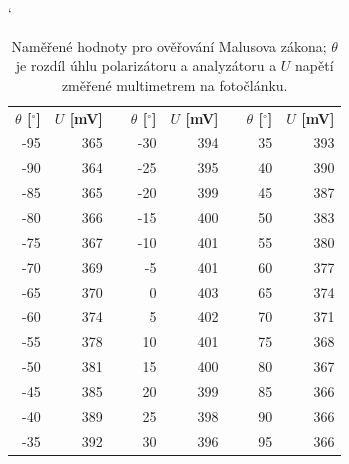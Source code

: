 \documentclass[english]{article}
\newcommand{\unit}[1]{\mathrm{#1}}
\begin{document}
				
		\begin{table}[htbp]
		\catcode` %
		  \centering
		    \begin{tabular}{|r|r|r|r|r|r|r|r|}
		\cline{1-2}\cline{4-5}\cline{7-8}    \boldmath{}\textbf{$\theta$ [$\unit{^\circ}$]}\unboldmath{} & \boldmath{}\textbf{$U$ [mV]}\unboldmath{} &       & \boldmath{}\textbf{$\theta$ [$\unit{^\circ}$]}\unboldmath{} & \boldmath{}\textbf{$U$ [mV]}\unboldmath{} &       & \boldmath{}\textbf{$\theta$ [$\unit{^\circ}$]}\unboldmath{} & \boldmath{}\textbf{$U$ [mV]}\unboldmath{} \bigstrut\\
		\cline{1-2}\cline{4-5}\cline{7-8}    -95   & 365   &       & -30   & 394   &       & 35    & 393 \bigstrut\\
		\cline{1-2}\cline{4-5}\cline{7-8}    -90   & 364   &       & -25   & 395   &       & 40    & 390 \bigstrut\\
		\cline{1-2}\cline{4-5}\cline{7-8}    -85   & 365   &       & -20   & 399   &       & 45    & 387 \bigstrut\\
		\cline{1-2}\cline{4-5}\cline{7-8}    -80   & 366   &       & -15   & 400   &       & 50    & 383 \bigstrut\\
		\cline{1-2}\cline{4-5}\cline{7-8}    -75   & 367   &       & -10   & 401   &       & 55    & 380 \bigstrut\\
		\cline{1-2}\cline{4-5}\cline{7-8}    -70   & 369   &       & -5    & 401   &       & 60    & 377 \bigstrut\\
		\cline{1-2}\cline{4-5}\cline{7-8}    -65   & 370   &       & 0     & 403   &       & 65    & 374 \bigstrut\\
		\cline{1-2}\cline{4-5}\cline{7-8}    -60   & 374   &       & 5     & 402   &       & 70    & 371 \bigstrut\\
		\cline{1-2}\cline{4-5}\cline{7-8}    -55   & 378   &       & 10    & 401   &       & 75    & 368 \bigstrut\\
		\cline{1-2}\cline{4-5}\cline{7-8}    -50   & 381   &       & 15    & 400   &       & 80    & 367 \bigstrut\\
		\cline{1-2}\cline{4-5}\cline{7-8}    -45   & 385   &       & 20    & 399   &       & 85    & 366 \bigstrut\\
		\cline{1-2}\cline{4-5}\cline{7-8}    -40   & 389   &       & 25    & 398   &       & 90    & 366 \bigstrut\\
		\cline{1-2}\cline{4-5}\cline{7-8}    -35   & 392   &       & 30    & 396   &       & 95    & 366 \bigstrut\\
		\cline{1-2}\cline{4-5}\cline{7-8}    \end{tabular}%
		
				  \caption{Naměřené hodnoty pro ověřování Malusova zákona; $\theta$ je rozdíl úhlu polarizátoru a analyzátoru a $U$ napětí změřené multimetrem na fotočlánku.}
		  \label{tab:malus}%
		\end{table}%
		
\end{document}
